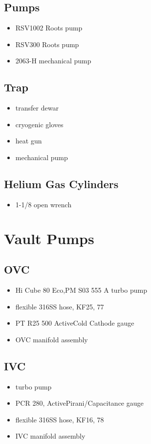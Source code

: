   \subsection{\hef{} Pumps}
\begin{itemize}
 \item {} RSV1002 Roots pump
 \item {} RSV300 Roots pump
 \item {} 2063-H mechanical pump
\end{itemize}

  \subsection{\lnn{} Trap}
\begin{itemize}
 \item \lnn{} transfer dewar
\item cryogenic gloves
\item heat gun
\item mechanical pump
\end{itemize}

  \subsection{Helium Gas Cylinders}
\begin{itemize}
 \item 1-1/8\inches{} open wrench
\end{itemize}


  
\section{Vault Pumps}
  \subsection{OVC}
\begin{itemize}
 \item {} Hi Cube 80 Eco,PM S03 555 A turbo pump
\item {} flexible 316SS hose, KF25, 77\inches
\item {} PT R25 500 ActiveCold Cathode gauge
\item OVC manifold assembly
\end{itemize}

  \subsection{IVC}
\begin{itemize}
 \item turbo pump
\item {} PCR 280, ActivePirani/Capacitance gauge
\item {} flexible 316SS hose, KF16, 78\inches
\item IVC manifold assembly
\end{itemize}


